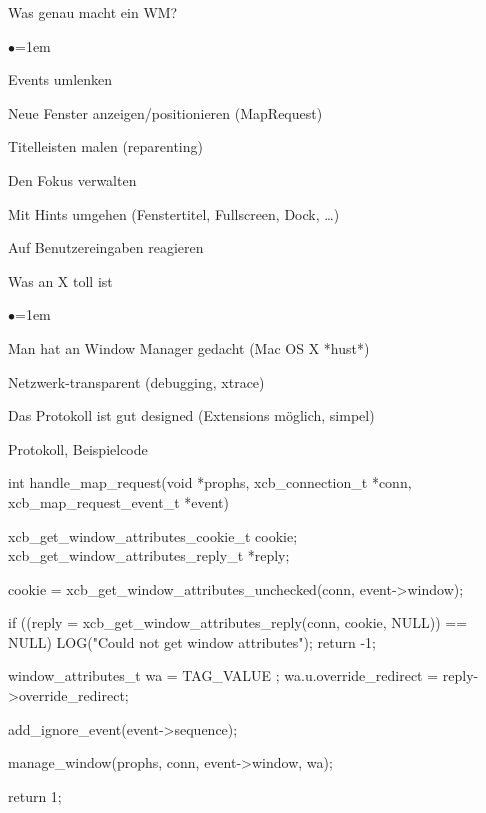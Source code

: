 \documentclass[mode=print,paper=screen,style=jefka]{powerdot}
\begin{document}
\begin{slide}{Was genau macht ein WM?}
\begin{list}{$\bullet$}{\itemsep=1em}
	\item<1-> Events umlenken
	\item<2-> Neue Fenster anzeigen/positionieren (MapRequest)
	\item<3-> Titelleisten malen (reparenting)
	\item<4-> Den Fokus verwalten
	\item<5-> Mit Hints umgehen (Fenstertitel, Fullscreen, Dock, …)
	\item<6-> Auf Benutzereingaben reagieren
\end{list}
\end{slide}

\begin{slide}{Was an X toll ist}
\begin{list}{$\bullet$}{\itemsep=1em}
	\item<1-> Man hat an Window Manager gedacht (Mac OS X *hust*)
	\item<2-> Netzwerk-transparent (debugging, xtrace)
	\item<3-> Das Protokoll ist gut designed (Extensions möglich, simpel)
\end{list}
\end{slide}

\begin{slide}[method=direct]{Protokoll, Beispielcode}
\begin{code}
int handle_map_request(void *prophs, xcb_connection_t *conn,
		       xcb_map_request_event_t *event) {
  xcb_get_window_attributes_cookie_t cookie;
  xcb_get_window_attributes_reply_t *reply;

  cookie = xcb_get_window_attributes_unchecked(conn, event->window);

  if ((reply = xcb_get_window_attributes_reply(conn, cookie, NULL))
      == NULL) {
          LOG("Could not get window attributes\n");
          return -1;
  }

  window_attributes_t wa = { TAG_VALUE };
  wa.u.override_redirect = reply->override_redirect;

  add_ignore_event(event->sequence);

  manage_window(prophs, conn, event->window, wa);

  return 1;
}
\end{code}
\end{slide}
\end{document}
